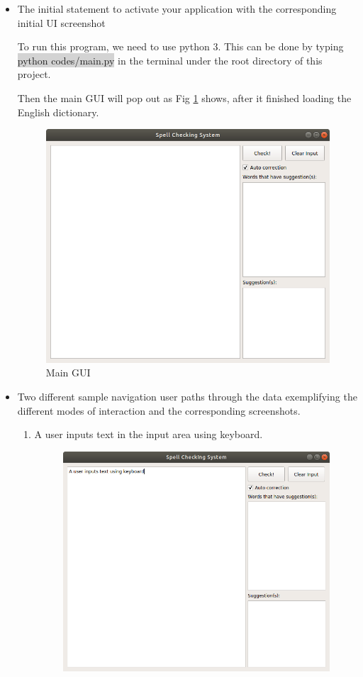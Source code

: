 \begin{itemize} 
\item{The initial statement to activate your application with the corresponding initial UI screenshot}
\par{To run this program, we need to use python 3. This can be done by typing \colorbox{lightgray}{python codes/main.py} in the terminal under the root directory of this project.}
\par{Then the main GUI will pop out as Fig \ref{fig:main-gui} shows, after it finished loading the English dictionary.}
\begin{figure}[H]
	\centering
	\includegraphics[width=\linewidth]{fig/main-gui.png}
	\caption{Main GUI}
	\label{fig:main-gui}
\end{figure}
\item{Two different sample navigation user paths through the data exemplifying the different modes of interaction and the corresponding screenshots. }
\begin{enumerate}
	\item {A user inputs text in the input area using keyboard.}
	\begin{figure}[H]
		\centering
		\includegraphics[width=.7\linewidth]{fig/path1.png}

\end{figure}
\end{enumerate}
\end{itemize}
